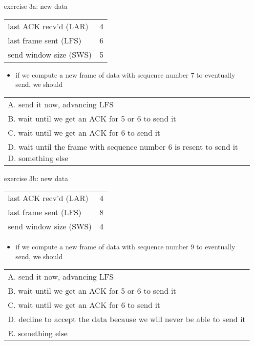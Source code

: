 \begin{frame}{exercise 3a: new data}
\begin{tabular}{l|l}
last ACK recv'd (LAR) & 4 \\
last frame sent (LFS) & 6 \\
send window size (SWS) & 5 \\
\end{tabular}
\begin{itemize}
\item if we compute a new frame of data with sequence number 7 to eventually
send, we should
\end{itemize}
\begin{tabular}{l}
A. send it now, advancing LFS \\
B. wait until we get an ACK for 5 or 6 to send it \\
C. wait until we get an ACK for 6 to send it \\
D. wait until the frame with sequence number 6 is resent to send it
D. something else \\
\end{tabular}
\end{frame}

\begin{frame}{exercise 3b: new data}
\begin{tabular}{l|l}
last ACK recv'd (LAR) & 4 \\
last frame sent (LFS) & 8 \\
send window size (SWS) & 4 \\
\end{tabular}
\begin{itemize}
\item if we compute a new frame of data with sequence number 9 to eventually
send, we should
\end{itemize}
\begin{tabular}{l}
A. send it now, advancing LFS \\
B. wait until we get an ACK for 5 or 6 to send it \\
C. wait until we get an ACK for 6 to send it \\
D. decline to accept the data because we will never be able to send it \\
E. something else \\
\end{tabular}
\end{frame}

